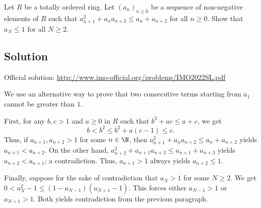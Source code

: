 Let $R$ be a totally ordered ring.
Let $(a_n)_{n \geq 0}$ be a sequence of non-negative elements of $R$ such that $a_{n + 1}^2 + a_n a_{n + 2} \leq a_n + a_{n + 2}$ for all $n \geq 0$.
Show that $a_N \leq 1$ for all $N \geq 2$.



\subsection*{Solution}

Official solution: \url{http://www.imo-official.org/problems/IMO2022SL.pdf}

We use an alternative way to prove that two consecutive terms starting from $a_1$ cannot be greater than $1$.

First, for any $b, c > 1$ and $a \geq 0$ in $R$ such that $b^2 + ac \leq a + c$, we get
\[ b < b^2 \leq b^2 + a(c - 1) \leq c. \]
Thus, if $a_{n + 1}, a_{n + 2} > 1$ for some $n \in \N$, then $a_{n + 1}^2 + a_n a_{n + 2} \leq a_n + a_{n + 2}$ yields $a_{n + 1} < a_{n + 2}$.
On the other hand, $a_{n + 2}^2 + a_{n + 1} a_{n + 3} \leq a_{n + 1} + a_{n + 3}$ yields $a_{n + 2} < a_{n + 1}$; a contradiction.
Thus, $a_{n + 1} > 1$ always yields $a_{n + 2} \leq 1$.

Finally, suppose for the sake of contradiction that $a_N > 1$ for some $N \geq 2$.
We get $0 < a_N^2 - 1 \leq (1 - a_{N - 1})(a_{N + 1} - 1)$.
This forces either $a_{N - 1} > 1$ or $a_{N + 1} > 1$.
Both yields contradiction from the previous paragraph.

